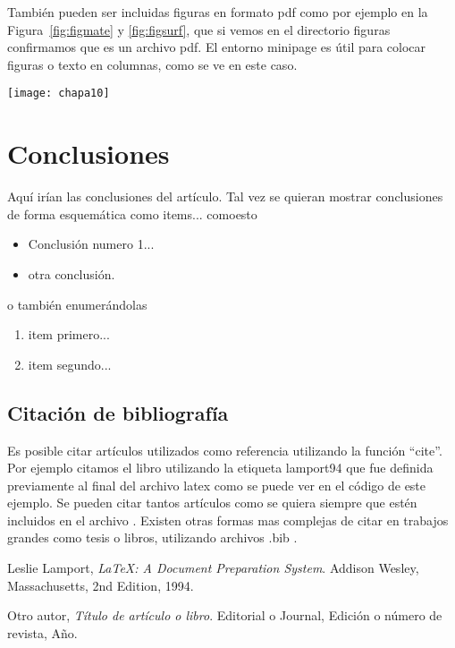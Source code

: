 \documentclass[a4paper,11pt]{article}
\begin{document}
\begin{minipage}[b]{0.45\textwidth}
También pueden ser incluidas figuras en formato pdf como por ejemplo en la Figura~\ref{fig:figmate} y \autoref{fig:figsurf}, que si vemos en el directorio figuras confirmamos que es un archivo pdf. El entorno minipage es útil para colocar figuras o texto en columnas, como se ve en este caso.  
    \end{minipage}
    \hfil
    \begin{minipage}{0.45\textwidth}
        \begin{center}
            \texttt{[image: chapa10]}
        \end{center}
    \end{minipage}


\newpage

\section{Conclusiones}
%
Aquí irían las conclusiones del artículo.  Tal vez se quieran mostrar conclusiones de forma esquemática como items... comoesto
%
\begin{itemize}
  \item Conclusión numero 1... 
  \item otra conclusión.
\end{itemize}

o también enumerándolas

\begin{enumerate}
  \item item primero...
  \item item segundo...
\end{enumerate}


\subsection{Citación de bibliografía}
%
Es posible citar artículos utilizados como referencia utilizando la función ``cite''. Por ejemplo citamos el libro \cite{lamport94} utilizando la etiqueta lamport94 que fue definida previamente al final del archivo latex como se puede ver en el código de este ejemplo. %
%
Se pueden citar tantos artículos como se quiera siempre que estén incluidos en el archivo \cite{otraetiqueta}. Existen otras formas mas complejas de citar en trabajos grandes como tesis o libros, utilizando archivos .bib . %
%


\begin{thebibliography}{15}

  Leslie Lamport,
  \emph{\LaTeX: A Document Preparation System}.
  Addison Wesley, Massachusetts,
  2nd Edition,
  1994.

  Otro autor,
  \emph{Título de artículo o libro}.
  Editorial o Journal,
  Edición o número de revista,
  Año.

\end{thebibliography}

\end{document}
